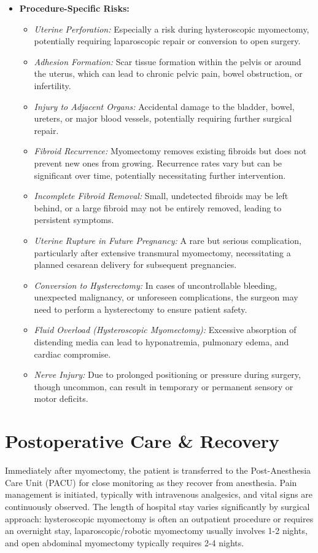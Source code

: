 \begin{itemize}
  \item \textbf{Procedure-Specific Risks:}
    \begin{itemize}
      \item \textit{Uterine Perforation:} Especially a risk during hysteroscopic myomectomy, potentially requiring laparoscopic repair or conversion to open surgery.
      \item \textit{Adhesion Formation:} Scar tissue formation within the pelvis or around the uterus, which can lead to chronic pelvic pain, bowel obstruction, or infertility.
      \item \textit{Injury to Adjacent Organs:} Accidental damage to the bladder, bowel, ureters, or major blood vessels, potentially requiring further surgical repair.
      \item \textit{Fibroid Recurrence:} Myomectomy removes existing fibroids but does not prevent new ones from growing. Recurrence rates vary but can be significant over time, potentially necessitating further intervention.
      \item \textit{Incomplete Fibroid Removal:} Small, undetected fibroids may be left behind, or a large fibroid may not be entirely removed, leading to persistent symptoms.
      \item \textit{Uterine Rupture in Future Pregnancy:} A rare but serious complication, particularly after extensive transmural myomectomy, necessitating a planned cesarean delivery for subsequent pregnancies.
      \item \textit{Conversion to Hysterectomy:} In cases of uncontrollable bleeding, unexpected malignancy, or unforeseen complications, the surgeon may need to perform a hysterectomy to ensure patient safety.
      \item \textit{Fluid Overload (Hysteroscopic Myomectomy):} Excessive absorption of distending media can lead to hyponatremia, pulmonary edema, and cardiac compromise.
      \item \textit{Nerve Injury:} Due to prolonged positioning or pressure during surgery, though uncommon, can result in temporary or permanent sensory or motor deficits.
    \end{itemize}
\end{itemize}

\section*{Postoperative Care \& Recovery}
Immediately after myomectomy, the patient is transferred to the Post-Anesthesia Care Unit (PACU) for close monitoring as they recover from anesthesia. Pain management is initiated, typically with intravenous analgesics, and vital signs are continuously observed. The length of hospital stay varies significantly by surgical approach: hysteroscopic myomectomy is often an outpatient procedure or requires an overnight stay, laparoscopic/robotic myomectomy usually involves 1-2 nights, and open abdominal myomectomy typically requires 2-4 nights.

